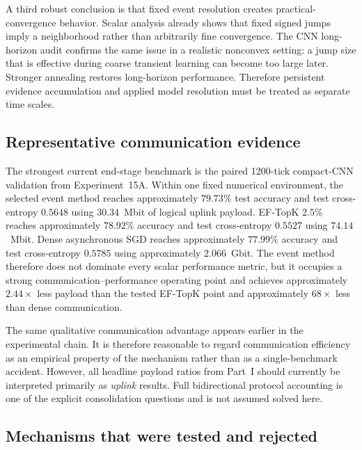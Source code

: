 A third robust conclusion is that fixed event resolution creates practical-convergence behavior. Scalar analysis already shows that fixed signed jumps imply a neighborhood rather than arbitrarily fine convergence. The CNN long-horizon audit confirms the same issue in a realistic nonconvex setting: a jump size that is effective during coarse transient learning can become too large later. Stronger annealing restores long-horizon performance. Therefore persistent evidence accumulation and applied model resolution must be treated as separate time scales.

\subsection{Representative communication evidence}

The strongest current end-stage benchmark is the paired 1200-tick compact-CNN validation from Experiment~15A. Within one fixed numerical environment, the selected event method reaches approximately $79.73\%$ test accuracy and test cross-entropy $0.5648$ using $30.34$~Mbit of logical uplink payload. EF-TopK $2.5\%$ reaches approximately $78.92\%$ accuracy and test cross-entropy $0.5527$ using $74.14$~Mbit. Dense asynchronous SGD reaches approximately $77.99\%$ accuracy and test cross-entropy $0.5785$ using approximately $2.066$~Gbit. The event method therefore does not dominate every scalar performance metric, but it occupies a strong communication--performance operating point and achieves approximately $2.44\times$ less payload than the tested EF-TopK point and approximately $68\times$ less than dense communication.

The same qualitative communication advantage appears earlier in the experimental chain. It is therefore reasonable to regard communication efficiency as an empirical property of the mechanism rather than as a single-benchmark accident. However, all headline payload ratios from Part~I should currently be interpreted primarily as \emph{uplink} results. Full bidirectional protocol accounting is one of the explicit consolidation questions and is not assumed solved here.

\subsection{Mechanisms that were tested and rejected}

